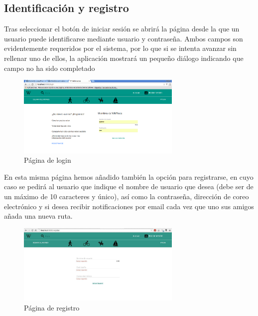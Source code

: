 \documentclass[11pt,a4paper]{article}
\begin{document}
\subsection{Identificación y registro}
Tras seleccionar el botón de iniciar sesión se abrirá la página desde la que un usuario puede identificarse mediante usuario y contraseña. Ambos campos son evidentemente requeridos por el sistema, por lo que si se intenta avanzar sin rellenar uno de ellos, la aplicación mostrará un pequeño diálogo indicando que campo no ha sido completado

\begin{figure}[h]
\centering
  \includegraphics[width=0.7\textwidth]{./imagenes/login}
  \caption{Página de login}
  \label{fig: Página de login}
\end{figure}
En esta misma página hemos añadido también la opción para registrarse, en cuyo caso se pedirá al usuario que indique el nombre de usuario que desea (debe ser de un máximo de 10 caracteres y único), así como la contraseña, dirección de coreo electrónico y si desea recibir notificaciones por email cada vez que uno sus amigos añada una nueva ruta.\\


\begin{figure}[h]
\centering
  \includegraphics[width=0.7\textwidth]{./imagenes/registro}
  \caption{Página de registro}
  \label{fig: Página de registro}
\end{figure}
\clearpage
\end{document}
